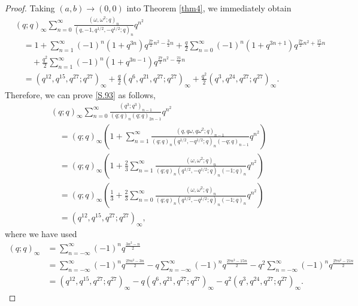 \documentclass[10pt,a4paper]{amsart}
\begin{document}
\begin{proof}
Taking $\left(a,b\right)\to\left(0,0\right)$ into Theorem \ref{thm4}, we immediately obtain
\begin{align}
&\left(q;q\right)_{\infty}\sum_{n=0}^{\infty}
\frac{\left(\omega,\omega^2;q\right)_n}
{\left(q,-1,q^{1/2},-q^{1/2};q\right)_n}q^{n^2}\nonumber\\
&\quad=1+\sum_{n=1}^{\infty}\left(-1\right)^n\left(1+q^{3n}\right)
q^{\frac{27}{2}n^2-\frac{3}{2}n}
+\frac{q}{2}\sum_{n=0}^{\infty}\left(-1\right)^n\left(1+q^{3n+1}\right)
q^{\frac{27}{2}n^2+\frac{15}{2}n}\nonumber\\
&\qquad+\frac{q^2}{2}\sum_{n=1}^{\infty}\left(-1\right)^n\left(1+q^{3n-1}\right)
q^{\frac{27}{2}n^2-\frac{21}{2}n}\nonumber\\
&\quad=\left(q^{12},q^{15},q^{27};q^{27}\right)_{\infty}
+\frac{q}{2}\left(q^{6},q^{21},q^{27};q^{27}\right)_{\infty}
+\frac{q^2}{2}\left(q^{3},q^{24},q^{27};q^{27}\right)_{\infty}.\label{A9}
\end{align}
Therefore, we can prove \eqref{S.93} as follows,
\begin{align}
&\left(q;q\right)_{\infty}\sum_{n=0}^{\infty}
\frac{\left(q^3;q^3\right)_{n-1}}
{\left(q;q\right)_n\left(q;q\right)_{2n-1}}q^{n^2}\nonumber\\
&\quad=\left(q;q\right)_{\infty}\left(1+\sum_{n=1}^{\infty}
\frac{\left(q,q\omega,q\omega^2;q\right)_{n-1}}
{\left(q;q\right)_n\left(q^{1/2},-q^{1/2};q\right)_{n}
\left(-q;q\right)_{n-1}}q^{n^2}\right)\nonumber\\
&\quad=\left(q;q\right)_{\infty}\left(1+\frac{2}{3}\sum_{n=1}^{\infty}
\frac{\left(\omega,\omega^2;q\right)_{n}}
{\left(q;q\right)_n\left(q^{1/2},-q^{1/2};q\right)_{n}
\left(-1;q\right)_{n}}q^{n^2}\right)\nonumber\\
&\quad=\left(q;q\right)_{\infty}\left(\frac{1}{3}+\frac{2}{3}\sum_{n=0}^{\infty}
\frac{\left(\omega,\omega^2;q\right)_{n}}
{\left(q;q\right)_n\left(q^{1/2},-q^{1/2};q\right)_{n}
\left(-1;q\right)_{n}}q^{n^2}\right)\nonumber\\
&\quad=\left(q^{12},q^{15},q^{27};q^{27}\right)_{\infty},
\end{align}
where we have used
\begin{align}
\left(q;q\right)_{\infty}%
&=\sum_{n=-\infty}^{\infty}\left(-1\right)^nq^{\frac{3n^2-n}{2}}\nonumber\\
&=\sum_{n=-\infty}^{\infty}\left(-1\right)^nq^{\frac{27n^2-3n}{2}}
-q\sum_{n=-\infty}^{\infty}\left(-1\right)^nq^{\frac{27n^2-15n}{2}}
-q^2\sum_{n=-\infty}^{\infty}\left(-1\right)^nq^{\frac{27n^2-21n}{2}}\nonumber\\
&=\left(q^{12},q^{15},q^{27};q^{27}\right)_{\infty}
-q\left(q^{6},q^{21},q^{27};q^{27}\right)_{\infty}
-q^2\left(q^{3},q^{24},q^{27};q^{27}\right)_{\infty}.\label{A10}
\end{align}


\end{proof}
\end{document}
